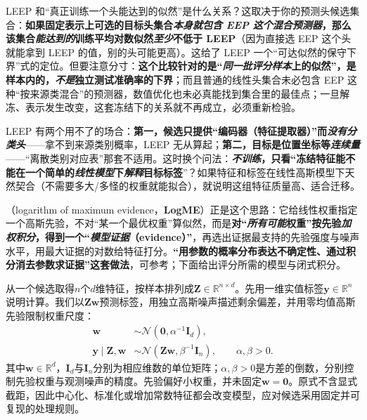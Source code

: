 LEEP 和“真正训练一个头能达到的似然”是什么关系？这取决于你的预测头候选集合：\textbf{如果固定表示上可选的目标头集合\emph{本身就包含 EEP 这个混合预测器}，那么该集合\emph{能达到的}训练平均对数似然\emph{至少}不低于 LEEP}（因为直接选 EEP 这个头就能拿到 LEEP 的值，别的头可能更高）。这给了 LEEP 一个“可达似然的保守下界”式的定位。但要注意分寸：\textbf{这个比较针对的是“\emph{同一批评分样本}上的似然”，是样本内的，\emph{不是}独立测试准确率的下界}；而且普通的线性头集合未必包含 EEP 这种“按来源类混合”的预测器，数值优化也未必真能找到集合里的最佳点；一旦解冻、表示发生改变，这套冻结下的关系就不再成立，必须重新检验。

LEEP 有两个用不了的场合：\textbf{第一，候选只提供“编码器（特征提取器）”而\emph{没有分类头}}——拿不到来源类别概率，LEEP 无从算起；\textbf{第二，目标是位置坐标等\emph{连续量}}——“离散类别对应表”那套不适用。这时换个问法：\textbf{\emph{不训练}，只看“冻结特征能不能在一个简单的\emph{线性模型}下\emph{解释}目标标签}”？如果特征和标签在线性高斯模型下天然契合（不需要多大/多怪的权重就能拟合），就说明这组特征质量高、适合迁移。

（logarithm of maximum evidence，\textbf{LogME}）正是这个思路：它给线性权重指定一个高斯先验，不对“某一个最优权重”算似然，而是\textbf{对“\emph{所有可能}权重”按先验\emph{加权积分}，得到一个“\emph{模型证据}（evidence）”}，再选出证据最支持的先验强度与噪声水平，用最大证据的对数给特征打分。\textbf{“用参数的概率分布表达不确定性、通过积分消去参数求证据”这套做法}，可参考；下面给出评分所需的模型与闭式积分。

从一个候选取得$n$个$d$维特征，按样本排列成$\bm Z\in\mathbb R^{n\times d}$。先用一维实值标签$\bm y\in\mathbb R^n$说明计算。我们以$\bm Z\bm w$预测标签，用独立高斯噪声描述剩余偏差，并用零均值高斯先验限制权重尺度：
\begin{equation}
  \begin{aligned}
    \bm w&\sim\mathcal N(\bm0,\alpha^{-1}\bm I_d),\\
    \bm y\mid\bm Z,\bm w
    &\sim\mathcal N(\bm Z\bm w,\beta^{-1}\bm I_n),
    \qquad \alpha,\beta>0.
  \end{aligned}
  \label{eq:ket-reuse-logme-model}
\end{equation}
其中$\bm w\in\mathbb R^d$，$\bm I_d$与$\bm I_n$分别为相应维数的单位矩阵；$\alpha,\beta>0$是方差的倒数，分别控制先验权重与观测噪声的精度。先验偏好小权重，并未固定$\bm w=\bm0$。原式不含显式截距，因此中心化、标准化或增加常数特征都会改变模型，应对候选采用固定并可复现的处理规则。


